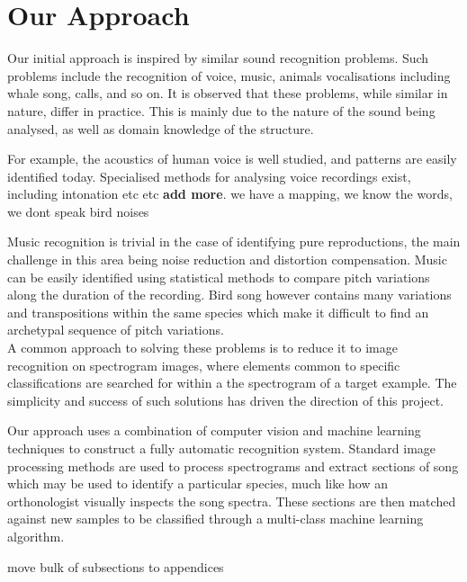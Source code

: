 \section{Our Approach}
Our initial approach is inspired by similar sound recognition problems.
Such problems include the recognition of voice, music, animals vocalisations
including whale song, calls, and so on.
It is observed that these problems, while similar in nature, differ in practice.
This is mainly due to the nature of the sound being analysed, as well as
domain knowledge of the structure.

For example, the acoustics of human voice is well studied, and patterns are
easily identified today.
Specialised methods for analysing voice recordings exist, including intonation
etc etc \textbf{add more}.
we have a mapping, we know the words, we dont speak bird noises

Music recognition is trivial in the case of identifying pure reproductions,
the main challenge in this area being noise reduction and distortion compensation.
Music can be easily identified using statistical methods to compare pitch
variations along the duration of the recording.
Bird song however contains many variations and transpositions within the same
species which make it difficult to find an archetypal sequence of pitch
variations.\\

A common approach to solving these problems is to reduce it to image recognition
on spectrogram images, where elements common to specific classifications are
searched for within a the spectrogram of a target example.
The simplicity and success of such solutions has driven the direction of this
project.

Our approach uses a combination of computer vision and machine learning
techniques to construct a fully automatic recognition system.
Standard image processing methods are used to process spectrograms and extract
sections of song which may be used to identify a particular species, much like
how an orthonologist visually inspects the song spectra.
These sections are then matched against new samples to be classified through a
multi-class machine learning algorithm.

move bulk of subsections to appendices

